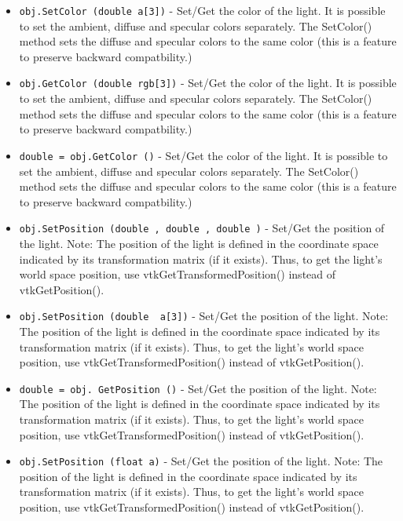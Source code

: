 \begin{itemize}
\item  \verb|obj.SetColor (double a[3])| -  Set/Get the color of the light. It is possible to set the ambient,
 diffuse and specular colors separately. The SetColor() method sets
 the diffuse and specular colors to the same color (this is a feature
 to preserve backward compatbility.)

\item  \verb|obj.GetColor (double rgb[3])| -  Set/Get the color of the light. It is possible to set the ambient,
 diffuse and specular colors separately. The SetColor() method sets
 the diffuse and specular colors to the same color (this is a feature
 to preserve backward compatbility.)

\item  \verb|double = obj.GetColor ()| -  Set/Get the color of the light. It is possible to set the ambient,
 diffuse and specular colors separately. The SetColor() method sets
 the diffuse and specular colors to the same color (this is a feature
 to preserve backward compatbility.)

\item  \verb|obj.SetPosition (double , double , double )| -  Set/Get the position of the light.
 Note: The position of the light is defined in the coordinate
 space indicated by its transformation matrix (if it exists).
 Thus, to get the light's world space position, use 
 vtkGetTransformedPosition() instead of vtkGetPosition().

\item  \verb|obj.SetPosition (double  a[3])| -  Set/Get the position of the light.
 Note: The position of the light is defined in the coordinate
 space indicated by its transformation matrix (if it exists).
 Thus, to get the light's world space position, use 
 vtkGetTransformedPosition() instead of vtkGetPosition().

\item  \verb|double = obj. GetPosition ()| -  Set/Get the position of the light.
 Note: The position of the light is defined in the coordinate
 space indicated by its transformation matrix (if it exists).
 Thus, to get the light's world space position, use 
 vtkGetTransformedPosition() instead of vtkGetPosition().

\item  \verb|obj.SetPosition (float a)| -  Set/Get the position of the light.
 Note: The position of the light is defined in the coordinate
 space indicated by its transformation matrix (if it exists).
 Thus, to get the light's world space position, use 
 vtkGetTransformedPosition() instead of vtkGetPosition().


\end{itemize}
